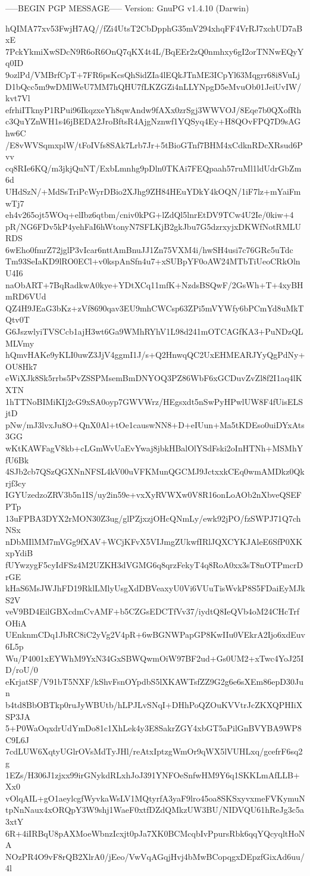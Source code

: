 -----BEGIN PGP MESSAGE-----
Version: GnuPG v1.4.10 (Darwin)

hQIMA77xv53FwjH7AQ//fZi4UtsT2CbDpphG35mV294xhqFF4VrRJ7xchUD7aBxE
7PckYkmiXwSDcN9R6oR6OnQ7qKX4t4L/BqEEr2zQ0nmhxy6gI2orTNNwEQyYq0ID
9ozlPd/VMBrfCpT+7FR6psKcsQhSidZIa4lEQkJTnME3ICpYl63Mqgrr68i8VuLj
D1bQcc5m9wDMlWeU7MM7hQHU7fLKZGZi4nLLYNpgD5eMvuOb01JeiUvIW/kvt7Vl
efrhiITknyP1RPui96IkqzxeYh8qwAndw9fAXx0zrSgj3WWVOJ/8Eqe7b0QXofRh
c3QuYZnWH1s46jBEDA2JroBftsR4AjgNznwf1YQSyq4Ey+H8QOvFPQ7D9sAGhw6C
/E8vWVSqmxplW/tFoIVfs8SAk7Lrb7Jr+5tBioGTnf7BHM4xCdknRDcXRsud6Pvv
cq8RIe6KQ/m3jkjQuNT/ExbLmnhg9pDln0TKAi7FEQpaah57ruMl1ldUdrGbZm6d
UHdSzN/+MdSsTriPcWyrDBio2XJhg9ZH84HEuYDkY4kOQN/1iF7lz+mYaiFmwTj7
eh4v265ojt5WOq+elIbz6qtbm/cniv0kPG+lZdQl5lnrEtDV9TCw4U2Ie/0kiw+4
pR/NG6FDv5kP4yehFaI6hWtonyN7SFLKjB2gkJbu7G5dzrxyjxDKWfNotRMLURDS
6wEho0fmrZ72jglP3vIcar6nttAmBnuJJ1Zn75VXM4i/hwSH4usi7c76GRc5uTdc
Tm93SeIaKD9lRO0ECl+v0kspAnSfn4u7+xSUBpYF0oAW24MTbTiUeoCRkOlnU4I6
naObART+7BqRadkwA0kye+YDtXCq11mfK+NzdsBSQwF/2GsWh+T+4xyBHmRD6VUd
QZ4H9JEaG3bKz+zVf8690qav3EU9mhCWCsp63ZPi5mVYWfy6bPCmYd8uMkTQtv0T
G6JszwlyiTVSCcb1ajH3wt6Ga9WMhRYhV1L98d241mOTCAGfKA3+PuNDzQLMLVmy
hQmvHAKe9yKLI0uwZ3JjV4ggmI1J/s+Q2HnwqQC2UxEHMEARJYyQgPdNy+OU8Hk7
eWiXJk8Sk5rrbs5PvZSSPMsemBmDNYOQ3PZ86WbF6xGCDuvZvZl8f2I1aq4lKXTN
1hTTNoBIMiKIj2cG9xSA0oyp7GWVWrz/HEgsxdt5nSwPyHPwlUW8F4fUisELSjtD
pNw/mJ3lvxJu8O+QnX0Al+tOe1causwNN8+D+eIUun+Ma5tKDEso0uiDYxAts3GG
wKtKAWFagV8kb+cLGmWvUaEvYwaj8jbkHBalOlYSdFski2oInHTNh+MSMhYfU6Bk
4SJb2cb7QSzQGXNnNFSL4kV00uVFKMunQGCMJ9JctxxkCEq0wmAMDkz0Qkrjf3cy
IGYUzedzoZRV3b5n1IS/uy2in59e+vxXyRVWXw0V8R16onLoAOb2nXbveQSEFPTp
13uFPBA3DYX2rMON30Z3ug/glPZjxzjOHcQNmLy/ewk92jPO/fzSWPJ71Q7chNSx
nDbMIlMM7mVGg9fXAV+WCjKFvX5VIJmgZUkwfIRlJQXCYKJAleE6SfP0XKxpYdiB
fUYwzygF5cyIdFSz4M2UZKH3dVGMG6q8qrzFekyT4q8RoA0xx3sT8nOTPmcrDrGE
kHaS6MsJWJhFD19RklLMlyUsgXdDBVeaxyU0Vi6VUuTisWvkP8S5FDaiEyMJkS2V
veV9BD4EilGBXcdmCvAMF+b5CZGsEDCTfVv37/iydtQ8IeQVb4oM24CHcTrfOHiA
UEnknmCDq1JbRC8iC2yVg2V4pR+6wBGNWPapGP8KwIIu0VEkrA2Ijo6xdEuv6L5p
Wu/P4001xEYWhM9YxN34GxSBWQwmOiW97BF2ud+Gs0UM2+xTwc4YoJ25ID/roU/0
eKrjatSF/V91bT5NXF/kShvFsnOYpdbS5lXKAWTsfZZ9G2g6e6sXEm86epD30Jun
b4td8BbOBTkp0ruJyWBUtb/hLPJLvSNqI+DHhPoQZOuKVVtrJcZKXQPHIiXSP3JA
5+P0WaOqxdrUdYmDo81c1XhLek4y3E8SakrZGY4xbGT5aPilGnBVYBA9WP8C9L6J
7cdLUW6XqtyUGlrOVsMdTyJHl/reAtxIptzgWmOr9qWX5lVUHLxq/gcefrF6sq2g
1EZs/H306J1zjxx99irGNykdRLxhJoJ391YNFOeSnfwHM9Y6q1SKKLmAfLLB+Xx0
vOlqAIL+gO1aeylcgfWyvkaWsLV1MQtyrfA3yaF9lro45oa8SKSxyvxmeFVKymuN
tpNnNaux4xORQpY3W9shj1WaeF0xtfDZdQMkzUW3BU/NIDVQU61hReJg3c5a3xtY
6R+4iIRBqU8pAXMoeWbnzIcxjt0pJa7XK0BCMcqbIvPpursRbk6qqYQcyqltHoNA
NOzPR4O9vF8rQB2XlrA0/jEeo/VwVqAGqjHvj4bMwBCopqgxDEpzfGixAd6uu/4l
